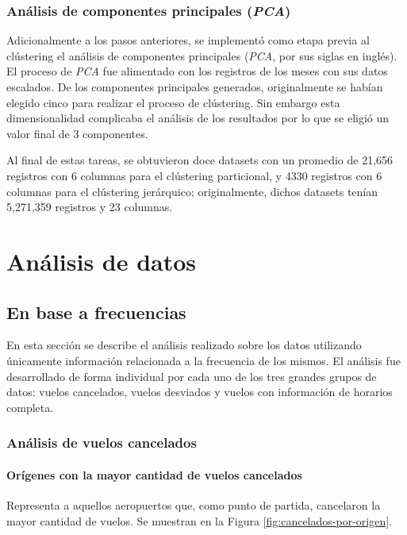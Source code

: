 \documentclass[12pt]{article}
\numberwithin{equation}{section}
\numberwithin{table}{section}
\numberwithin{figure}{section}
\begin{document}
\subsubsection{Análisis de componentes principales (\emph{PCA})}
Adicionalmente a los pasos anteriores, se implementó como etapa previa al clústering el análisis de componentes principales (\emph{PCA}, por sus siglas en inglés).
El proceso de \emph{PCA} fue alimentado con los registros de los meses con sus datos escalados. 
De los componentes principales generados, originalmente se habían elegido cinco para realizar el proceso de clústering. 
Sin embargo esta dimensionalidad complicaba el análisis de los resultados por lo que se eligió un valor final de 3 componentes.

Al final de estas tareas, se obtuvieron doce datasets con un promedio de 21,656 registros con 6 columnas para el clústering particional, y 4330 registros con 6 columnas para el clústering jerárquico; originalmente, dichos datasets tenían 5,271,359 registros y 23 columnas.

\section{Análisis de datos}
\subsection{En base a frecuencias}
En esta sección se describe el análisis realizado sobre los datos utilizando únicamente información relacionada a la frecuencia de los mismos.
El análisis fue desarrollado de forma individual por cada uno de los tres grandes grupos de datos: vuelos cancelados, vuelos desviados y vuelos con información de horarios completa.

\subsubsection{Análisis de vuelos cancelados}
\paragraph{Orígenes con la mayor cantidad de vuelos cancelados}
Representa a aquellos aeropuertos que, como punto de partida, cancelaron la mayor cantidad de vuelos. Se muestran en la Figura \ref{fig:cancelados-por-origen}.
\end{document}
